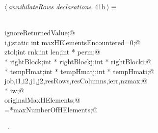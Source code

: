 \documentclass{article}
\begin{document}
\begin{flushleft} \small
\begin{minipage}{\linewidth}\label{scrap53}\raggedright\small
{} $\langle\,${\itshape annihilateRows declarations}\nobreak\ {\footnotesize {41b}}$\,\rangle\equiv$
\vspace{-1ex}
\begin{list}{}{} \item
\mbox{}\verb@@\\
\mbox{}\verb@int ignoreReturnedValue;@\\
\mbox{}\verb@int i,j;static int maxHElementsEncountered=0;@\\
\mbox{}\verb@double ztol;int rnk;int len;int * perm;@\\
\mbox{}\verb@double * rightBlock;int * rightBlockj;int * rightBlocki;@\\
\mbox{}\verb@double * tempHmat;int * tempHmatj;int * tempHmati;@\\
\mbox{}\verb@int job,i1,i2,j1,j2,resRows,resColumns,ierr,nzmax;@\\
\mbox{}\verb@int * iw;@\\
\mbox{}\verb@int originalMaxHElements;@\\
\mbox{}\verb@originalMaxHElements=*maxNumberOfHElements;@\\
\mbox{}\verb@@{\NWsep}
\end{list}
\vspace{-1.5ex}
\footnotesize
\begin{list}{}{\setlength{\itemsep}{-\parsep}\setlength{\itemindent}{-\leftmargin}}
\item \NWtxtMacroRefIn\ .

\end{list}
\end{minipage}
\end{flushleft}
\end{document}
